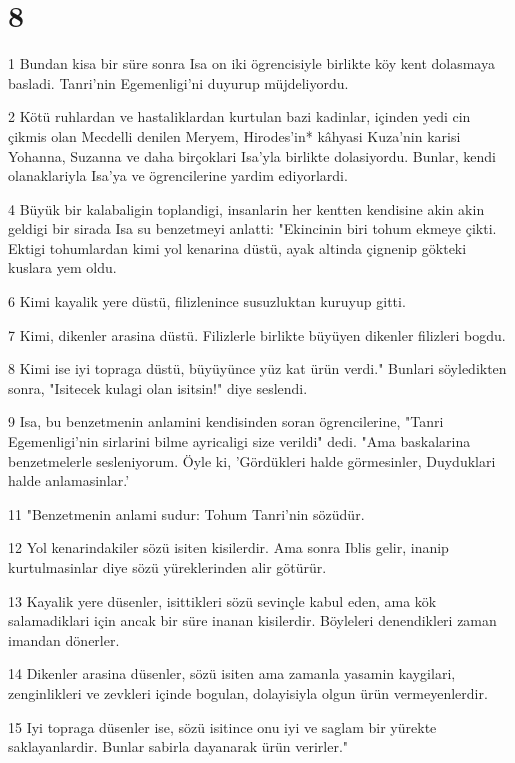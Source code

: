 \chapter{8}

\par 1 Bundan kisa bir süre sonra Isa on iki ögrencisiyle birlikte köy kent dolasmaya basladi. Tanri'nin Egemenligi'ni duyurup müjdeliyordu.
\par 2 Kötü ruhlardan ve hastaliklardan kurtulan bazi kadinlar, içinden yedi cin çikmis olan Mecdelli denilen Meryem, Hirodes'in* kâhyasi Kuza'nin karisi Yohanna, Suzanna ve daha birçoklari Isa'yla birlikte dolasiyordu. Bunlar, kendi olanaklariyla Isa'ya ve ögrencilerine yardim ediyorlardi.
\par 4 Büyük bir kalabaligin toplandigi, insanlarin her kentten kendisine akin akin geldigi bir sirada Isa su benzetmeyi anlatti: "Ekincinin biri tohum ekmeye çikti. Ektigi tohumlardan kimi yol kenarina düstü, ayak altinda çignenip gökteki kuslara yem oldu.
\par 6 Kimi kayalik yere düstü, filizlenince susuzluktan kuruyup gitti.
\par 7 Kimi, dikenler arasina düstü. Filizlerle birlikte büyüyen dikenler filizleri bogdu.
\par 8 Kimi ise iyi topraga düstü, büyüyünce yüz kat ürün verdi." Bunlari söyledikten sonra, "Isitecek kulagi olan isitsin!" diye seslendi.
\par 9 Isa, bu benzetmenin anlamini kendisinden soran ögrencilerine, "Tanri Egemenligi'nin sirlarini bilme ayricaligi size verildi" dedi. "Ama baskalarina benzetmelerle sesleniyorum. Öyle ki, 'Gördükleri halde görmesinler, Duyduklari halde anlamasinlar.'
\par 11 "Benzetmenin anlami sudur: Tohum Tanri'nin sözüdür.
\par 12 Yol kenarindakiler sözü isiten kisilerdir. Ama sonra Iblis gelir, inanip kurtulmasinlar diye sözü yüreklerinden alir götürür.
\par 13 Kayalik yere düsenler, isittikleri sözü sevinçle kabul eden, ama kök salamadiklari için ancak bir süre inanan kisilerdir. Böyleleri denendikleri zaman imandan dönerler.
\par 14 Dikenler arasina düsenler, sözü isiten ama zamanla yasamin kaygilari, zenginlikleri ve zevkleri içinde bogulan, dolayisiyla olgun ürün vermeyenlerdir.
\par 15 Iyi topraga düsenler ise, sözü isitince onu iyi ve saglam bir yürekte saklayanlardir. Bunlar sabirla dayanarak ürün verirler."
